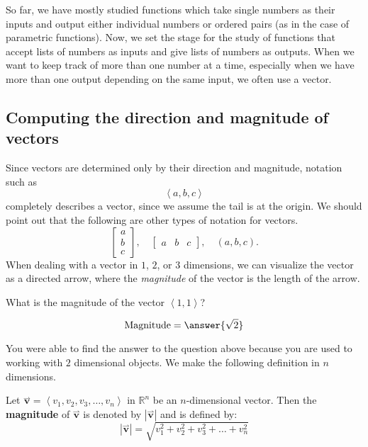 \documentclass{ximera}
\renewcommand{\vec}[1]{{\overset{\boldsymbol{\rightharpoonup}}{\mathbf{#1}}}}
\renewcommand{\vector}[1]{\left\langle #1\right\rangle}
\begin{document}
So far, we have mostly studied functions which take single numbers as
their inputs and output either individual numbers or ordered pairs (as
in the case of parametric functions).  Now, we set the stage for the
study of functions that accept lists of numbers as inputs and give lists of
numbers as outputs. When we want to keep track of more than one number
at a time, especially when we have more than one output depending on the 
same input, we often use a vector.



\subsection{Computing the direction and magnitude of vectors}


Since vectors are determined only by their direction and magnitude,
notation such as
\[
\vector{a,b,c}
\]
completely describes a vector, since we assume the tail is at the
origin. We should point out that the following are other types of notation for vectors.
\[
\begin{bmatrix}
  a\\
  b\\
  c
\end{bmatrix}, \quad
\begin{bmatrix}
  a & b & c
\end{bmatrix},
\quad
(a,b,c).
\]
When dealing with a vector in $1$, $2$, or $3$ dimensions, we can
visualize the vector as a directed arrow, where the \textit{magnitude} of the vector 
is the length of the arrow.

\begin{question}
  What is the magnitude of the vector $\vector{1,1}$?
  \begin{prompt}
    \[
    \text{Magnitude}  = \answer{\sqrt{2}}
    \]
  \end{prompt}
\end{question}

You were able to find the answer to the question above because you are
used to working with $2$ dimensional objects.  We make the following
definition in $n$ dimensions.

\begin{definition}
	Let $\vec{v} = \vector{v_1, v_2, v_3, \dots, v_n}$ in $\mathbb{R}^n$
        be an $n$-dimensional vector.  Then the \textbf{magnitude} of
        $\vec{v}$ is denoted by $|\vec{v}|$ and is defined by:
	\[
	|\vec{v}| = \sqrt{v_1^2+v_2^2+v_3^2+\dots+v_n^2}
	\]
\end{definition}
\end{document}
